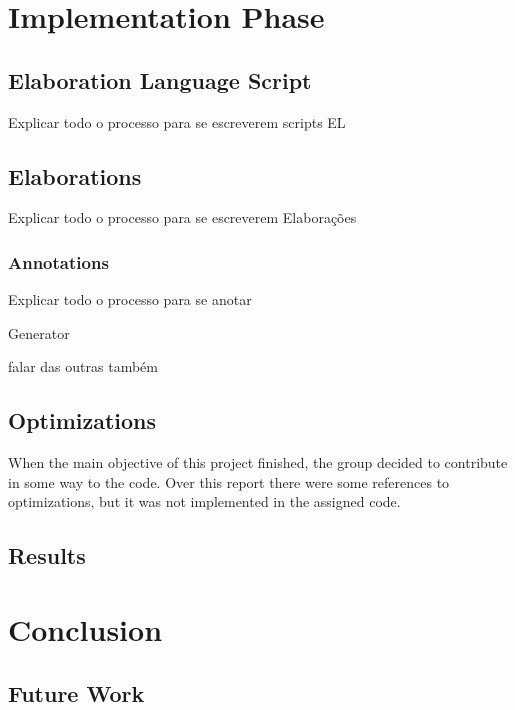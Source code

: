 \documentclass{report}
\begin{document}
\chapter{Implementation Phase}

	\section{Elaboration Language Script}
	
	\par Explicar todo o processo para se escreverem scripts EL
	
	\section{Elaborations}
	
	\par Explicar todo o processo para se escreverem Elaborações
	
	\subsection{Annotations}
	
	\par Explicar todo o processo para se anotar
	
	\par Generator
	
	\par falar das outras também
	
	\section{Optimizations}
	
	\par When the main objective of this project finished, the group decided to contribute in some way to the code. Over this report there were some references to optimizations, but it was not implemented in the assigned code. 
	
	\section{Results}
	



\chapter{Conclusion}

	\section{Future Work} 

\newpage
	
{}

	
\end{document}
